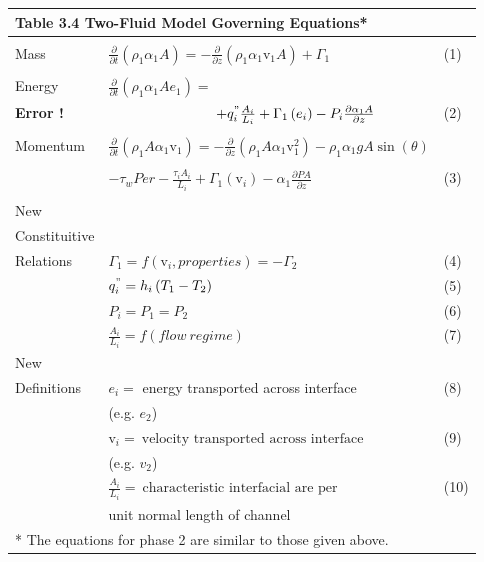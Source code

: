 \documentclass[12pt,fleqn]{report}
\begin{document}
{\newpage
\clearpage
\samepage \begin{tabular}%
{*{3}{l}}
\multicolumn{3}{l}{\bf Table  3.4  Two-Fluid Model Governing Equations*} \\ [5mm] \hline
  &   &  \\ 
Mass & $\frac{\partial}{\partial t} \left( \rho_{1} \alpha_{1} A \right) = - \frac{\partial}{\partial z} \left( \rho_{1} \alpha_{1} \mbox{v}_{1} A \right) + \Gamma_{1}$ & (1)\\ 
   &  &   \\ 
Energy & $\frac{\partial}{\partial t} \left( \rho_{1} \alpha_{1} Ae_{1} \right) =$ & \\ 
{\bf Error !} & $\hspace{27mm} +q_{i}^{"} \frac{A_{i}}{L_{i}} + \Gamma_{1} \left( e_{i} \right) - P_{i}\frac{\partial \alpha_{1} A}{\partial z}$ & (2)\\ 
    &   &  \\ 
Momentum & $\frac{\partial}{\partial t}\left( \rho_{1}A \alpha_{1} \mbox{v}_{1} \right) = - \frac{\partial}{\partial z} \left( \rho_{1} A \alpha_{1} \mbox{v}_{1}^{2} \right) - \rho_{1} \alpha_{1}g A \sin(\theta)$ & \\ 
    &    &   \\ 
         & \hspace{27mm} $- \tau_{w}Per -  \frac{\tau_{i}A_{i}}{L_{i}} + \Gamma_{1} \left( \mbox{v}_{i} \right) - \alpha_{1}\frac{\partial PA}{\partial z}$ & (3)\\ 
 & & \\ 
New & & \\ 
Constituitive & &  \\ 
Relations  & $\Gamma_{1} = f \left( \mbox{v}_{i}, properties \right) = - \Gamma_{2}$ &  (4)\\ 
  & $q_{i}^{"} = h_{i} \left( T_{1} - T_{2} \right)$  & (5) \\ 
  & $P_{i} = P_{1} = P_{2}$ & (6) \\ 
  & $\frac{A_{i}}{L_{i}} = f(flow \: regime)$ & (7) \\ 
New  &  &  \\ 
Definitions & $e_{i} =$ energy transported across interface & (8)\\ 
            & \hspace{30mm} (e.g. $e_{2}$) & \\ 
            & $\mbox{v}_{i} = \: \mbox{velocity transported across interface}$ & (9)\\ 
            & \hspace{30mm} (e.g. $v_{2}$) & \\ 
            & $\frac{A_{i}}{L_{i}}= \: \mbox{characteristic interfacial are per}$ & (10) \\ 
            & \hspace{10mm} unit normal length of channel &  \\  [5mm] \hline
\multicolumn{3}{l}{* The equations for phase 2 are similar to those given above.}
\end{tabular}
}
\end{document}
